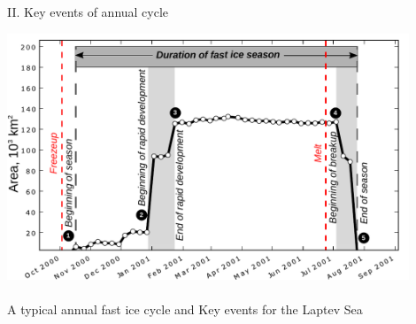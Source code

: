 \documentclass[8pt]{beamer}
\newcommand\Fontvi{\fontsize{6}{7.2}\selectfont}
\begin{document}
\setwatermark{\fontsize{125pt}{125pt}\selectfont{}}
\begin{frame}[fragile]{II. Key events of annual cycle}
		\begin{center}
				\includegraphics[width=0.9\textwidth]{./img/Key_events_LS0.pdf}\\~\\
				A typical annual fast ice cycle and Key events for the Laptev Sea
		\end{center}

\end{frame}
\end{document}
